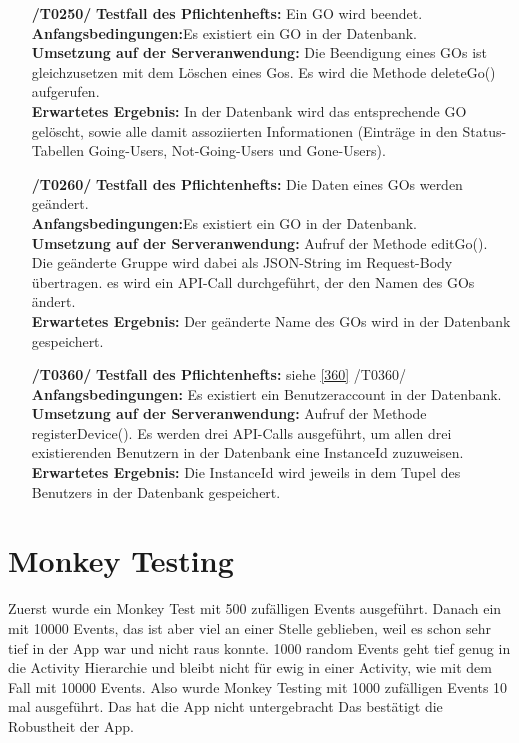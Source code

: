 \documentclass[11pt,a4paper]{scrartcl}
\begin{document}
\begin{enumerate}
	\item[\textbf{/T0250/}]
	\textbf{Testfall des Pflichtenhefts: }Ein GO wird beendet.\\
	\textbf{Anfangsbedingungen:}Es existiert ein GO in der Datenbank.\\
	\textbf{Umsetzung auf der Serveranwendung: }Die Beendigung eines GOs ist gleichzusetzen mit dem Löschen eines Gos. Es wird die Methode deleteGo() aufgerufen.\\
	\textbf{Erwartetes Ergebnis: }In der Datenbank wird das entsprechende GO gelöscht, sowie alle damit assoziierten Informationen (Einträge in den Status-Tabellen Going-Users, Not-Going-Users und Gone-Users).
	
	\item[\textbf{/T0260/}]
	\textbf{Testfall des Pflichtenhefts: }Die Daten eines GOs werden geändert.\\
	\textbf{Anfangsbedingungen:}Es existiert ein GO in der Datenbank.\\
	\textbf{Umsetzung auf der Serveranwendung: }Aufruf der Methode editGo(). Die geänderte Gruppe wird dabei als JSON-String im Request-Body übertragen. es wird ein API-Call durchgeführt, der den Namen des GOs ändert.\\
	\textbf{Erwartetes Ergebnis: }Der geänderte Name des GOs wird in der Datenbank gespeichert.
	
	\item[\textbf{/T0360/}]
	\textbf{Testfall des Pflichtenhefts: }siehe \ref{360} /T0360/\\
	\textbf{Anfangsbedingungen:} Es existiert ein Benutzeraccount in der Datenbank.\\
	\textbf{Umsetzung auf der Serveranwendung: }Aufruf der Methode registerDevice(). Es werden drei API-Calls ausgeführt, um allen drei existierenden Benutzern in der Datenbank eine InstanceId zuzuweisen.\\
	\textbf{Erwartetes Ergebnis: }Die InstanceId wird jeweils in dem Tupel des Benutzers in der Datenbank gespeichert.
	
\end{enumerate}

\newpage

\section{Monkey Testing}

Zuerst wurde ein Monkey Test mit 500 zufälligen Events ausgeführt. Danach ein mit 10000 Events, das ist aber viel an einer Stelle geblieben, weil es schon sehr tief in der App war und nicht raus konnte. 1000 random Events geht tief genug in die Activity Hierarchie und bleibt nicht für ewig in einer Activity, wie mit dem Fall mit 10000 Events. Also wurde Monkey Testing mit 1000 zufälligen Events 10 mal ausgeführt. Das hat die App nicht untergebracht Das bestätigt die Robustheit der App.
\end{document}
